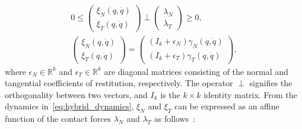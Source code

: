\begin{equation}
  \begin{gathered}
    0 \leq 
    \begin{pmatrix}
      \xi_N(q, \dot{q}) \\
      \xi_T(q, \dot{q})
    \end{pmatrix} 
    \perp
      \begin{pmatrix}
        \lambda_N  \\
        \lambda_T
      \end{pmatrix} \geq 0, \\
    \begin{pmatrix}
      \xi_N(q, \dot{q}) \\
      \xi_T(q, \dot{q})
    \end{pmatrix} =
      \begin{pmatrix}
        (I_k+\epsilon_N) \gamma_N(q, \dot{q})  \\
        (I_k+\epsilon_T) \gamma_T(q, \dot{q})
      \end{pmatrix},
  \end{gathered}
  \label{eq:complementarity} 
\end{equation}
\noindent where $\epsilon_N \in \mathbb{R}^k$ and $\epsilon_T \in \mathbb{R}^k$
are diagonal matrices consisting of the normal and tangential coefficients of
restitution, respectively. The operator $\perp$ signifies the orthogonality
between two vectors, and $I_k$ is the $k \times k$ identity matrix.
% 
From the dynamics in~\eqref{eq:hybrid_dynamics}, $\xi_N$ and $\xi_T$ can be
expressed as an affine function of the contact forces $\lambda_N$ and
$\lambda_T$ as follows~\cite{glocker2005formulation}:

